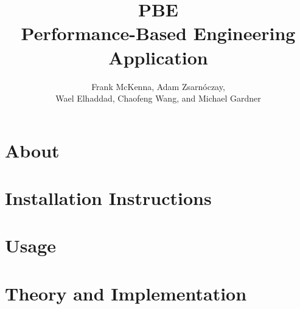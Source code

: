 \documentclass{simcenterdocumentation}
\begin{document}
\title{PBE\\ Performance-Based Engineering Application}
\author{Frank McKenna, Adam Zsarn\'oczay, \\ Wael Elhaddad, Chaofeng Wang, and Michael Gardner}

\hypersetup{pageanchor=false}
\maketitle
\copyrightpage
\acknowledgments

\hypersetup{pageanchor=true}
\begin{frontmatter}

\pagestyle{plain}
{
  \renewcommand{\thispagestyle}[1]{}
  \tableofcontents
  \clearpage
  \listoffigures
  \clearpage
  \listoftables
}

\end{frontmatter}
\pagestyle{somewhatsimple}

\chapter{About}
\label{chap:about}


\chapter{Installation Instructions}
\label{chap:installation}


\chapter{Usage}
\label{chap:usage}


\chapter{Theory and Implementation}
\label{chap:theory}

\end{document}
